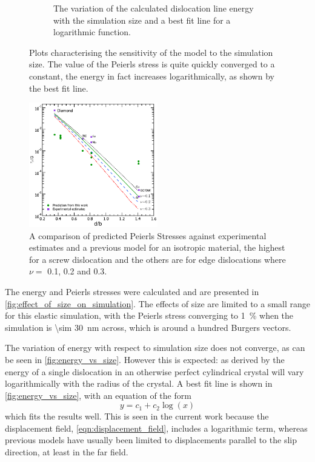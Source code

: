\begin{figure}
\begin{subfigure}{0.4\textwidth}
\caption{The variation of the calculated dislocation line energy with the simulation size and a best fit line for a logarithmic function.\label{fig:energy_vs_size}}
\end{subfigure}
\caption[The effect of simulation size on dislocation energy and Peierls stress.]{Plots characterising the sensitivity of the model to the simulation size. The value of the Peierls stress is quite quickly converged to a constant, the energy in fact increases logarithmically, as shown by the best fit line.\label{fig:effect_of_size_on_simulation}}
\end{figure}

\begin{figure}
\centering
\includegraphics[width=0.5\textwidth]{tp_G_vs_d_b}
\caption[A comparison of predicted Peierls Stresses against previous estimates.]{A comparison of predicted Peierls Stresses against experimental estimates \cite{Wang1996} and a previous model \cite{Clegg2006} for an isotropic material, the highest for a screw dislocation and the others are for edge dislocations where $\nu=$ 0.1, 0.2 and 0.3. \label{fig:tp_vs_d_b}}
\end{figure}


The energy and Peierls stresses were calculated and are presented in \autoref{fig:effect_of_size_on_simulation}. The effects of size are limited to a small range for this elastic simulation, with the Peierls stress converging to \SI{1}{\percent} when the simulation is  \SI{\sim 30}{\nano\meter} across, which is around a hundred Burgers vectors.

The variation of energy with respect to simulation size does not converge, as can be seen in \autoref{fig:energy_vs_size}. However this is expected: as derived by \citet{Nabarro1947} the energy of a single dislocation in an otherwise perfect cylindrical crystal will vary logarithmically with the radius of the crystal. A best fit line is shown in \autoref{fig:energy_vs_size}, with an equation of the form
\begin{equation}
y = c_1 + c_2 \log \left( x \right)
\end{equation}
which fits the results well. This is seen in the current work because the displacement field, \autoref{eqn:displacement_field},  includes a logarithmic term, whereas previous models have usually been limited to displacements parallel to the slip direction, at least in the far field.



